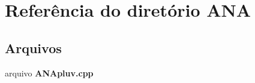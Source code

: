 \section{Referência do diretório A\+NA}
\label{dir_964c68efd7f72e6d66dbedd6ceae01e6}
\subsection*{Arquivos}
\begin{DoxyCompactItemize}
\item 
arquivo {\bf A\+N\+Apluv.\+cpp}
\end{DoxyCompactItemize}
